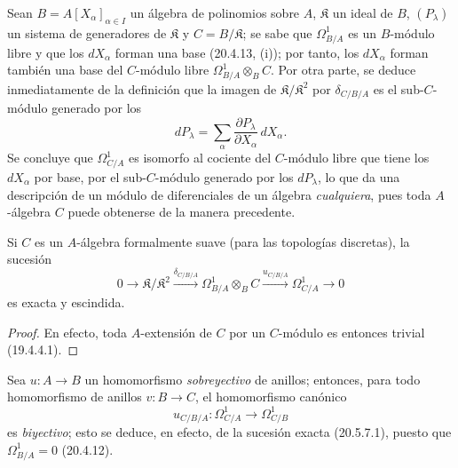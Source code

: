 \begin{example}[20.5.13]
\label{0.20.5.13-fr}
Sean $B=A[X_\alpha]_{\alpha\in I}$ un álgebra de polinomios sobre $A$,
$\mathfrak{K}$ un ideal de $B$, $(P_\lambda)$ un sistema de generadores
de $\mathfrak{K}$ y $C=B/\mathfrak{K}$; se sabe que
$\Omega^1_{B/A}$ es un $B$-módulo libre y que los $dX_\alpha$ forman una
base (20.4.13, (i)); por tanto, los $dX_\alpha$ forman también una base del
$C$-módulo libre $\Omega^1_{B/A}\otimes_B C$. Por otra parte, se deduce
inmediatamente de la definición que la imagen de
$\mathfrak{K}/\mathfrak{K}^2$ por $\delta_{C/B/A}$ es el sub-$C$-módulo
generado por los
\[
  dP_\lambda=\sum_\alpha
  \frac{\partial P_\lambda}{\partial X_\alpha}\,dX_\alpha.
\]
Se concluye que $\Omega^1_{C/A}$ es isomorfo al cociente del
$C$-módulo libre que tiene los $dX_\alpha$ por base, por el sub-$C$-módulo
generado por los $dP_\lambda$, lo que da una descripción de un módulo
de diferenciales de un álgebra \emph{cualquiera}, pues toda $A$-álgebra
$C$ puede obtenerse de la manera precedente.
\end{example}

\begin{corollary}[20.5.14]
\label{0.20.5.14-fr}
Si $C$ es un $A$-álgebra formalmente suave (para las topologías
discretas), la sucesión
\begin{equation}
\tag{20.5.14.1}
\label{0.20.5.14.1-fr}
  0\longrightarrow\mathfrak{K}/\mathfrak{K}^2
  \xrightarrow{\delta_{C/B/A}}\Omega^1_{B/A}\otimes_B C
  \xrightarrow{u_{C/B/A}}\Omega^1_{C/A}\longrightarrow0
\end{equation}
es exacta y escindida.
\end{corollary}

\begin{proof}
En efecto, toda $A$-extensión de $C$ por un $C$-módulo es entonces trivial
(19.4.4.1).
\end{proof}

\begin{remark}[20.5.15]
\label{0.20.5.15-fr}
Sea $u:A\to B$ un homomorfismo \emph{sobreyectivo} de anillos; entonces, para
todo homomorfismo de anillos $v:B\to C$, el homomorfismo canónico
\begin{equation}
\tag{20.5.15.1}
\label{0.20.5.15.1-fr}
  u_{C/B/A}:\Omega^1_{C/A}\longrightarrow\Omega^1_{C/B}
\end{equation}
es \emph{biyectivo}; esto se deduce, en efecto, de la sucesión exacta (20.5.7.1),
puesto que $\Omega^1_{B/A}=0$ (20.4.12).
\end{remark}

